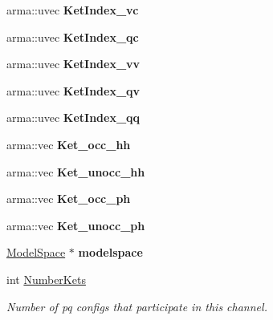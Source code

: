 \begin{DoxyCompactItemize}
\mbox{\label{classTwoBodyChannel_a762dcd5771433d50dcfdeffa70f29c78}} 
arma\+::uvec {\bfseries Ket\+Index\+\_\+vc}
\item 
\mbox{\label{classTwoBodyChannel_aea3d9206d21bcc360bac06ee4d344b8d}} 
arma\+::uvec {\bfseries Ket\+Index\+\_\+qc}
\item 
\mbox{\label{classTwoBodyChannel_a9233dd7b2b0dcaddf9790fd1583a411b}} 
arma\+::uvec {\bfseries Ket\+Index\+\_\+vv}
\item 
\mbox{\label{classTwoBodyChannel_a755fa9513101476da3186df726fbd822}} 
arma\+::uvec {\bfseries Ket\+Index\+\_\+qv}
\item 
\mbox{\label{classTwoBodyChannel_a85704e33df96cc58026f2f96f44ca055}} 
arma\+::uvec {\bfseries Ket\+Index\+\_\+qq}
\item 
\mbox{\label{classTwoBodyChannel_ac0063833a374d8642cd6b4d8db7be1e2}} 
arma\+::vec {\bfseries Ket\+\_\+occ\+\_\+hh}
\item 
\mbox{\label{classTwoBodyChannel_a74dc7bbce6fd62461c08be4ddb224de3}} 
arma\+::vec {\bfseries Ket\+\_\+unocc\+\_\+hh}
\item 
\mbox{\label{classTwoBodyChannel_ad61411aa8b1e79b924a238c69fd9b574}} 
arma\+::vec {\bfseries Ket\+\_\+occ\+\_\+ph}
\item 
\mbox{\label{classTwoBodyChannel_af12dd5e981795a79aaa58e05a1012628}} 
arma\+::vec {\bfseries Ket\+\_\+unocc\+\_\+ph}
\item 
\mbox{\label{classTwoBodyChannel_a8fbda0f207db13abc96f7d6bb577c715}} 
\hyperlink{classModelSpace}{Model\+Space} $\ast$ {\bfseries modelspace}
\item 
\mbox{\label{classTwoBodyChannel_a7c74165bacde3f9e8fa2b6448ff48622}} 
int \hyperlink{classTwoBodyChannel_a7c74165bacde3f9e8fa2b6448ff48622}{Number\+Kets}
\begin{DoxyCompactList}\small\item\em Number of pq configs that participate in this channel. \end{DoxyCompactList}\item 

\end{DoxyCompactItemize}
